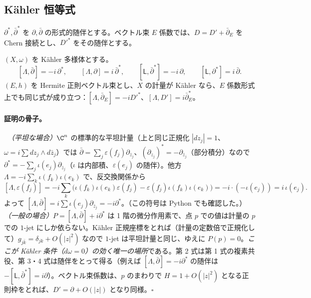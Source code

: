 \subsection{Kähler 恒等式}
$\partial^*,\bar\partial^*$ を $\partial,\bar\partial$ の形式的随伴とする。ベクトル束 $E$ 係数では、$D=D'+\bar\partial_E$ を Chern 接続とし、$D'^*$ をその随伴とする。
\begin{thm}\label{thm:kid}\tC
$(X,\omega)$ を Kähler 多様体とする。
\[
[\Lambda,\bar\partial]=-i\,\partial^*,\qquad[\Lambda,\partial]=i\,\bar\partial^*,\qquad[\mathsf L,\bar\partial^*]=-i\,\partial,\qquad[\mathsf L,\partial^*]=i\,\bar\partial .
\]
$(E,h)$ を Hermite 正則ベクトル束とし、$X$ の計量が Kähler なら、$E$ 係数形式上でも同じ式が成り立つ：$[\Lambda,\bar\partial_E]=-iD'^*$、$[\Lambda,D']=i\bar\partial_E^*$。
\end{thm}
\paragraph{証明の骨子。}\tP\ \emph{（平坦な場合）}$\C^n$ の標準的な平坦計量（上と同じ正規化 $|dz_j|=1$、$\omega=i\sum dz_j\wedge d\bar z_j$）では $\bar\partial=\sum_j\varepsilon(f_j)\partial_{\bar z_j}$、$(\partial_{z_j})^*=-\partial_{\bar z_j}$（部分積分）なので $\partial^*=-\sum_j\iota(e_j)\partial_{\bar z_j}$（$\iota$ は内部積、$\varepsilon(e_j)$ の随伴）。他方 $\Lambda=-i\sum_k\iota(f_k)\iota(e_k)$ で、反交換関係から
\[
[\Lambda,\varepsilon(f_j)]=-i\sum_k\big(\iota(f_k)\iota(e_k)\varepsilon(f_j)-\varepsilon(f_j)\iota(f_k)\iota(e_k)\big)=-i\cdot(-\iota(e_j))=i\,\iota(e_j).
\]
よって $[\Lambda,\bar\partial]=i\sum\iota(e_j)\partial_{\bar z_j}=-i\partial^*$。（この符号は Python でも確認した。）\emph{（一般の場合）}$P=[\Lambda,\bar\partial]+i\partial^*$ は 1 階の微分作用素で、点 $p$ での値は計量の $p$ での $1$-jet にしか依らない。Kähler 正規座標をとれば（計量の定数倍で正規化して）$g_{j\bar k}=\delta_{jk}+O(|z|^2)$ なので $1$-jet は平坦計量と同じ、ゆえに $P(p)=0$。\emph{ここが Kähler 条件（$d\omega=0$）の効く唯一の場所}である。第 2 式は第 1 式の複素共役、第 3・4 式は随伴をとって得る（例えば $[\Lambda,\bar\partial]=-i\partial^*$ の随伴は $-[\mathsf L,\bar\partial^*]=i\partial$）。ベクトル束係数は、$p$ のまわりで $H=1+O(|z|^2)$ となる正則枠をとれば、$D'=\partial+O(|z|)$ となり同様。\hfill$\square$

